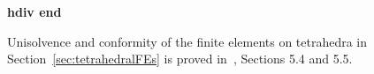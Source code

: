 {\bf hdiv end}


\begin{remark}
  Unisolvence and conformity of the finite elements on tetrahedra in
  Section~\ref{sec:tetrahedralFEs}
  is proved in~\cite{monk}, Sections 5.4 and 5.5.
\end{remark}
